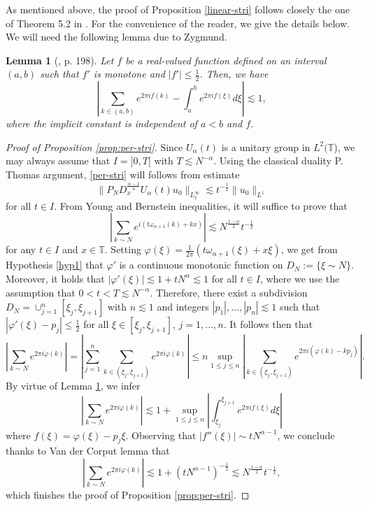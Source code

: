 \documentclass{amsart}
\newtheorem{lemma}[theorem]{Lemma}
\theoremstyle{definition}
\theoremstyle{remark}
\newcommand{\T}{\mathbb{T}}
\numberwithin{equation}{section}
\begin{document}
As mentioned above, the proof of Proposition \ref{linear-stri} follows closely the one of Theorem 5.2 in \cite{KPV}.   For the convenience of the reader, we give the details below. 
We will need the following lemma due to Zygmund.
\begin{lemma}[\cite{Z}, p. 198]\label{lem:Zyg}
  Let $f$ be a real-valued function defined on an interval $(a,b)$ such that $f'$ is monotone and $|f'|\le\frac 12$. Then, we have
  $$
  \left| \sum_{k\in (a,b)} e^{2\pi if(k)} - \int_a^b e^{2\pi i f(\xi)}d\xi\right|\lesssim 1,
  $$
  where the implicit constant is independent of $a<b$ and $f$. 
\end{lemma}
\begin{proof}[Proof of Proposition \ref{prop:per-stri}]
  Since $U_\alpha(t)$ is a unitary group in $L^2(\T$), we may always assume that $I=]0,T[$ with $T\lesssim N^{-\alpha}$. Using the classical duality P. Thomas argument, \eqref{per-stri} will follows from estimate
  $$
  \|P_ND_x^{\frac{\alpha-1}4}U_\alpha(t)u_0\|_{L^\infty_x} \lesssim t^{-\frac 12} \|u_0\|_{L^1}
  $$
  for all $t\in I$. From Young and Bernstein inequalities, it will suffice to prove that 
  $$
  \left|\sum_{k\sim N} e^{i(t\omega_{\alpha+1}(k)+kx)}\right| \lesssim N^{\frac{1-\alpha}2} t^{-\frac 12} 
  $$
 for any $t\in I$ and $x\in\T$. Setting $\varphi(\xi) = \frac 1{2\pi}(t\omega_{\alpha+1}(\xi)+x\xi)$, we get from Hypothesis \ref{hyp1} that $\varphi'$ is a continuous monotonic function on $D_N:=\{\xi\sim N\}$. Moreover, it holds that $|\varphi'(\xi)|\lesssim 1+tN^\alpha\lesssim 1$ for all $t\in I$, where we use the assumption that $0<t<T \lesssim N^{-\alpha}$. Therefore, there exist a subdivision $D_N=\cup_{j=1}^n [\xi_j, \xi_{j+1}]$ with $n \lesssim 1$  and integers $|p_1|,\ldots, |p_n|\lesssim 1$ such that $|\varphi'(\xi)-p_j|\le \frac 12$ for all $\xi \in  [\xi_j, \xi_{j+1}]$, $j=1,\ldots, n$. It follows then that
  $$
  \left|\sum_{k\sim N} e^{2\pi i \varphi(k)}\right| = \left| \sum_{j=1}^n \sum_{k\in (\xi_j,\xi_{j+1})} e^{2\pi i\varphi(k)}\right| \le n \sup_{1\le j\le n} \left| \sum_{k\in(\xi_j,\xi_{j+1})} e^{2\pi i(\varphi(k)-kp_j)}\right| .
  $$
  By virtue of Lemma \ref{lem:Zyg}, we infer
  $$
  \left|\sum_{k\sim N} e^{2\pi i \varphi(k)}\right| \lesssim 1+ \sup_{1\le j\le n} \left|\int_{\xi_j}^{\xi_{j+1}} e^{2\pi if(\xi)}d\xi\right|
  $$
  where $f(\xi) = \varphi(\xi)-p_j\xi$. Observing that $|f''(\xi)|\sim tN^{\alpha-1}$, we conclude thanks to Van der Corput lemma that
  $$
  \left|\sum_{k\sim N} e^{2\pi i \varphi(k)}\right| \lesssim 1 + (tN^{\alpha-1})^{-\frac 12} \lesssim N^{\frac{1-\alpha}2} t^{-\frac 12},
  $$
which finishes the proof of Proposition \ref{prop:per-stri}.   
\end{proof}
\end{document}
